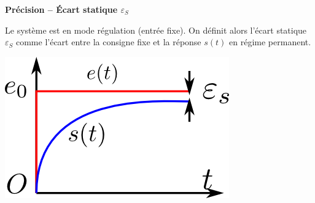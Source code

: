 \documentclass[10pt,fleqn]{article} %
\begin{document}
\begin{defi}
\textbf{Précision -- Écart statique $\varepsilon_S$}

\begin{minipage}[c]{0.7\textwidth}

Le système est en mode régulation
(entrée fixe). On définit alors l'écart statique $\varepsilon_S$ comme l'écart
entre la consigne fixe et la réponse $s(t)$ en régime permanent.%
\end{minipage}\hfill
\begin{minipage}[c]{0.2\textwidth}
 \begin{center}
 \includegraphics[width=\textwidth]{images/precision_stat}
 \end{center}
\end{minipage}

\end{defi}
\end{document}
